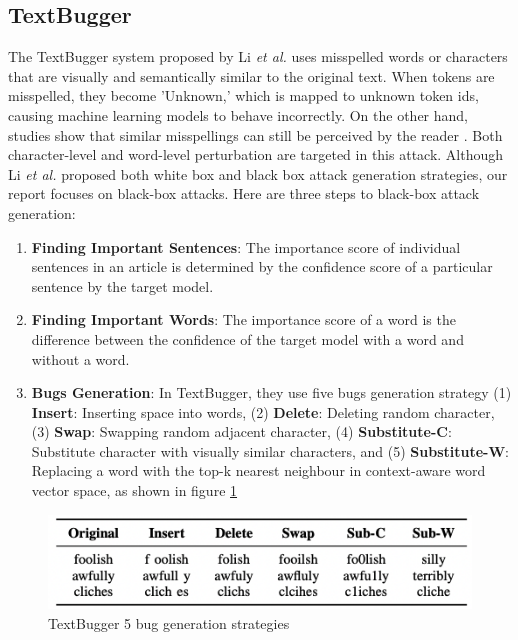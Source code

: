 \documentclass[%
	BCOR=8mm, %
	DIV=12,
	toc=bibliography, %
	toc=listof, %
	oneside, %
	egregdoesnotlikesansseriftitles, %
	]{scrbook}
\begin{document}
\subsection{TextBugger}
\label{subsection:textbugger}
The TextBugger system proposed by Li \textit{et al.} \cite{li_textbugger_2019} uses misspelled words or characters that are visually and semantically similar to the original text. When tokens are misspelled, they become 'Unknown,' which is mapped to unknown token ids, causing machine learning models to behave incorrectly. On the other hand, studies show that similar misspellings can still be perceived by the reader \cite{rawlinson_significance_2007,alzantot_generating_2018}. Both character-level and word-level perturbation are targeted in this attack. Although Li \textit{et al.} \cite{li_textbugger_2019}  proposed both white box and black box attack generation strategies, our report focuses on black-box attacks. Here are three steps to black-box attack generation:
\begin{enumerate}
    \item \textbf{Finding Important Sentences}: The importance score of individual sentences in an article is determined by the confidence score of a particular sentence by the target model.
    \item \textbf{Finding Important Words}: The importance score of a word is the difference between the confidence of the target model with a word and without a word.
    \item \textbf{Bugs Generation}: In TextBugger, they use five bugs generation strategy (1) \textbf{Insert}: Inserting space into words, (2) \textbf{Delete}: Deleting random character,
    (3) \textbf{Swap}: Swapping random adjacent character, (4) \textbf{Substitute-C}: Substitute character with visually similar characters, and (5)\textbf{ Substitute-W}: Replacing a word with the top-k nearest neighbour in context-aware word vector space, as shown in figure \ref{diag:textbug}
\end{enumerate}

\begin{figure}[H]
    \centering
    \includegraphics[width=.7\textwidth]{img/textbugger_5strat.png}
    \caption[Example of 5 bug generation strategies of TextBugger]{TextBugger 5 bug generation strategies \cite{li_textbugger_2019} }
    \label{diag:textbug}
\end{figure}
\end{document}
